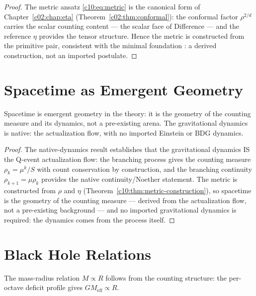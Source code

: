 \begin{proof}
The metric ansatz \eqref{c10:eq:metric} is the canonical form of Chapter~\ref{c02:chap:eta}
(Theorem~\ref{c02:thm:conformal}): the conformal factor $\rho^{2/d}$ carries the scalar
counting content --- the scalar face of Difference --- and the reference $\eta$ provides the
tensor structure. Hence the metric is constructed from the primitive pair, consistent with
the minimal foundation \cite{c10:QG292}: a derived construction, not an imported postulate.
\end{proof}

\section{Spacetime as Emergent Geometry}
\label{c10:sec:emergent-geometry}

\begin{theorem}
\label{c10:thm:spacetime-emergent}
Spacetime is emergent geometry in the theory: it is the geometry of the counting measure
and its dynamics, not a pre-existing arena. The gravitational dynamics is native: the
actualization flow, with no imported Einstein or BDG dynamics.
\end{theorem}

\begin{proof}
The native-dynamics result \cite{c10:QG222} establishes that the gravitational dynamics IS the
Q-event actualization flow: the branching process gives the counting measure $\rho_k =
\mu^k/S$ with count conservation by construction, and the branching continuity
$\rho_{k+1} = \mu\rho_k$ provides the native continuity/Noether statement. The metric is
constructed from $\rho$ and $\eta$ (Theorem~\ref{c10:thm:metric-construction}), so spacetime
is the geometry of the counting measure --- derived from the actualization flow, not a
pre-existing background --- and no imported gravitational dynamics is required: the
dynamics comes from the process itself.
\end{proof}

\section{Black Hole Relations}
\label{c10:sec:black-hole}

\begin{theorem}
\label{c10:thm:mass-radius}
The mass-radius relation $M \propto R$ follows from the counting structure: the per-octave
deficit profile gives $GM_{\mathrm{eff}} \propto R$.
\end{theorem}

